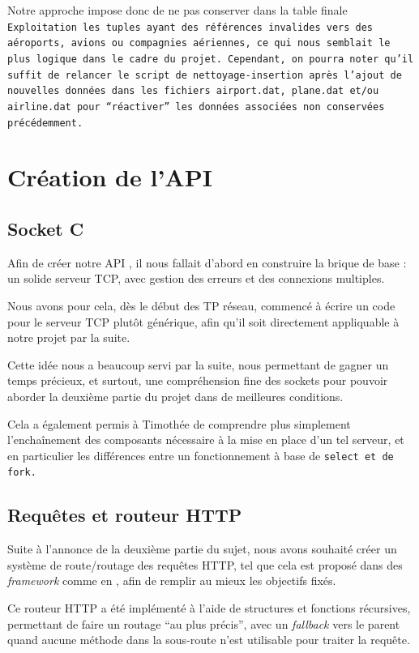 \documentclass[a4paper, 11pt, twoside]{book}
\begin{document}
Notre approche impose donc de ne pas conserver dans la table finale \tt{Exploitation} les tuples ayant des références invalides vers des aéroports, avions ou compagnies aériennes, ce qui nous semblait le plus logique dans le cadre du projet. Cependant, on pourra noter qu'il suffit de relancer le script de nettoyage-insertion après l'ajout de nouvelles données dans les fichiers \tt{airport.dat}, \tt{plane.dat} et/ou \tt{airline.dat} pour ``réactiver'' les données associées non conservées précédemment.

\section{Création de l'API }

\subsection{Socket C}

Afin de créer notre API , il nous fallait d'abord en construire la brique de base : un solide serveur TCP, avec gestion des erreurs et des connexions multiples.

Nous avons pour cela, dès le début des TP réseau, commencé à écrire un code pour le serveur TCP plutôt générique, afin qu'il soit directement appliquable à notre projet par la suite.

Cette idée nous a beaucoup servi par la suite, nous permettant de gagner un temps précieux, et surtout, une compréhension fine des sockets pour pouvoir aborder la deuxième partie du projet dans de meilleures conditions.

Cela a également permis à Timothée de comprendre plus simplement l'enchaînement des composants nécessaire à la mise en place d'un tel serveur, et en particulier les différences entre un fonctionnement à base de \tt{select} et de \tt{fork}.

\subsection{Requêtes et routeur HTTP}

Suite à l'annonce de la deuxième partie du sujet, nous avons souhaité créer un système de route/routage des requêtes HTTP, tel que cela est proposé dans des \emph{framework} comme  en , afin de remplir au mieux les objectifs fixés.

Ce routeur HTTP a été implémenté à l'aide de structures et fonctions récursives, permettant de faire un routage ``au plus précis'', avec un \emph{fallback} vers le parent quand aucune méthode dans la sous-route n'est utilisable pour traiter la requête.
\end{document}
